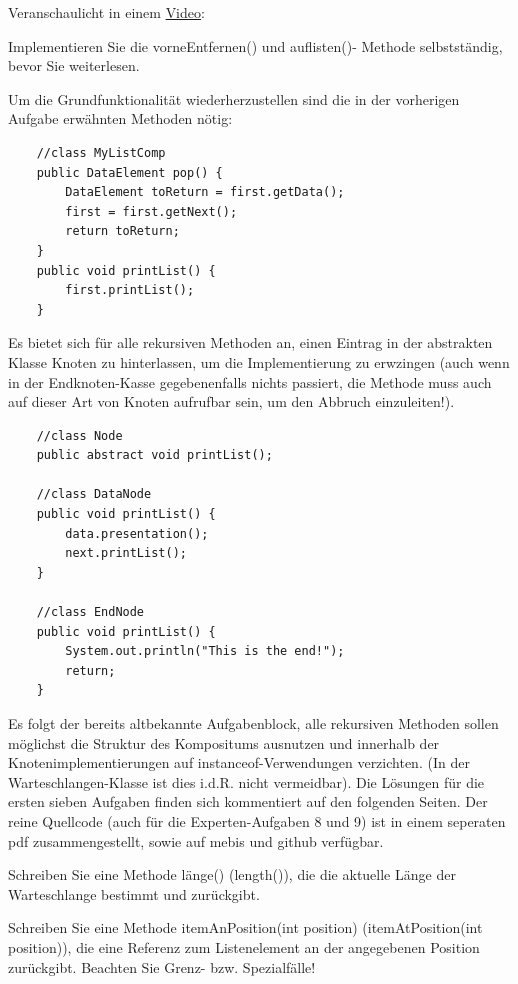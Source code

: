 \documentclass{article}
\begin{document}
Veranschaulicht in einem \href{https://youtu.be/1YPStkwFbKI}{Video}:
\begin{task}{2}
    Implementieren Sie die vorneEntfernen() und auflisten()- Methode selbstständig, bevor Sie weiterlesen. 
\end{task}
\vspace{3cm}
Um die Grundfunktionalität wiederherzustellen sind die in der vorherigen Aufgabe erwähnten Methoden nötig:
\begin{verbatim}
    //class MyListComp
    public DataElement pop() {
        DataElement toReturn = first.getData();
        first = first.getNext();
        return toReturn;
    }
    public void printList() {
        first.printList();
    }
\end{verbatim}
Es bietet sich für alle rekursiven Methoden an, einen Eintrag in der abstrakten Klasse Knoten zu hinterlassen, um die Implementierung zu erwzingen (auch wenn in der Endknoten-Kasse gegebenenfalls nichts passiert, die Methode muss auch auf dieser Art von Knoten aufrufbar sein, um den Abbruch einzuleiten!).
\begin{verbatim}
    //class Node
    public abstract void printList();

    //class DataNode
    public void printList() {
        data.presentation();
        next.printList(); 
    }

    //class EndNode 
    public void printList() {
        System.out.println("This is the end!");
        return;    
    }
\end{verbatim}

Es folgt der bereits altbekannte Aufgabenblock, alle rekursiven Methoden sollen möglichst die Struktur des Kompositums ausnutzen und innerhalb der Knotenimplementierungen auf instanceof-Verwendungen verzichten. (In der Warteschlangen-Klasse ist dies i.d.R. nicht vermeidbar). Die Lösungen für die ersten sieben Aufgaben finden sich kommentiert auf den folgenden Seiten. Der reine Quellcode (auch für die Experten-Aufgaben 8 und 9) ist in einem seperaten pdf zusammengestellt, sowie auf mebis und github verfügbar. \\ 

\begin{task}{3} 
    Schreiben  Sie eine Methode länge() (length()), die die aktuelle Länge der Warteschlange bestimmt und zurückgibt.   
\end{task}

\begin{task}{4}
    Schreiben Sie eine Methode itemAnPosition(int position) (itemAtPosition(int position)), die eine Referenz zum Listenelement an der angegebenen Position zurückgibt. Beachten Sie Grenz- bzw. Spezialfälle!
\end{task}
    
\end{document}
